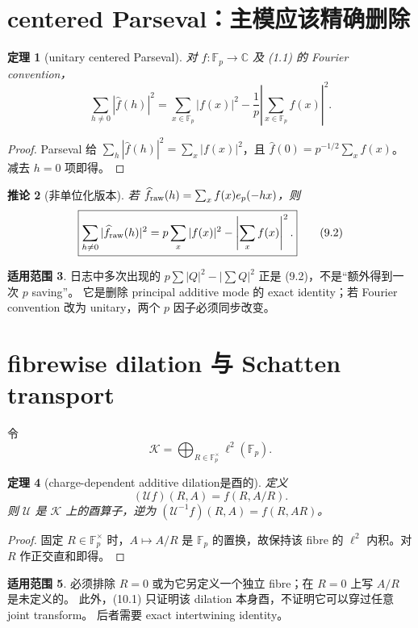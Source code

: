 \documentclass[11pt,a4paper]{ctexart}
\newtheorem{theorem}{定理}[section]
\newtheorem{corollary}[theorem]{推论}
\theoremstyle{definition}
\newtheorem{remark}[theorem]{适用范围}
\newcommand{\F}{\mathbb F}
\newcommand{\C}{\mathbb C}
\newcommand{\G}{\F_p^\times}
\newcommand{\ep}{e_p}
\newcommand{\1}{\mathbf 1}
\begin{document}
\section{centered Parseval：主模应该精确删除}

\begin{theorem}[unitary centered Parseval]
对 $f:\F_p\to\C$ 及 (1.1) 的 Fourier convention，
\[
\boxed{
\sum_{h\ne0}|\widehat f(h)|^2
=\sum_{x\in\F_p}|f(x)|^2
-\frac1p\left|\sum_{x\in\F_p}f(x)\right|^2.}
\tag{9.1}
\]
\end{theorem}

\begin{proof}
Parseval 给 $\sum_h|\widehat f(h)|^2=\sum_x|f(x)|^2$，且
$\widehat f(0)=p^{-1/2}\sum_xf(x)$。减去 $h=0$ 项即得。
\end{proof}

\begin{corollary}[非单位化版本]
若 $\widehat f_{\rm raw}(h)=\sum_xf(x)\ep(-hx)$，则
\[
\boxed{
\sum_{h\ne0}|\widehat f_{\rm raw}(h)|^2
=p\sum_x|f(x)|^2-\left|\sum_xf(x)\right|^2.}
\tag{9.2}
\]
\end{corollary}

\begin{remark}
日志中多次出现的
$p\sum|Q|^2-|\sum Q|^2$ 正是 (9.2)，不是“额外得到一次 $p$ saving”。
它是删除 principal additive mode 的 exact identity；若 Fourier convention 改为
unitary，两个 $p$ 因子必须同步改变。
\end{remark}

\section{fibrewise dilation 与 Schatten transport}

令
\[
\mathscr K=\bigoplus_{R\in\G}\ell^2(\F_p).
\]

\begin{theorem}[charge-dependent additive dilation是酉的]
定义
\[
(\mathcal U f)(R,A)=f(R,A/R).
\tag{10.1}
\]
则 $\mathcal U$ 是 $\mathscr K$ 上的酉算子，逆为
\((\mathcal U^{-1}f)(R,A)=f(R,AR)\)。
\end{theorem}

\begin{proof}
固定 $R\in\G$ 时，$A\mapsto A/R$ 是 $\F_p$ 的置换，故保持该 fibre 的
$\ell^2$ 内积。对 $R$ 作正交直和即得。
\end{proof}

\begin{remark}
必须排除 $R=0$ 或为它另定义一个独立 fibre；在 $R=0$ 上写 $A/R$ 是未定义的。
此外，(10.1) 只证明该 dilation 本身酉，不证明它可以穿过任意 joint transform。
后者需要 exact intertwining identity。
\end{remark}
\end{document}
